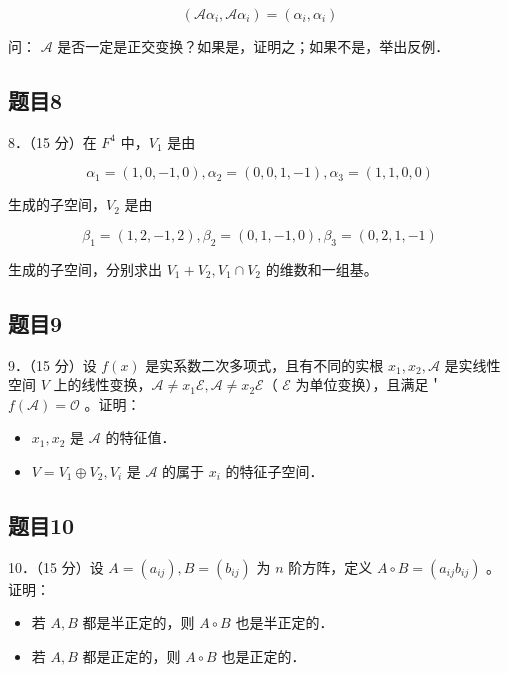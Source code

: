 \documentclass{article}
\begin{document}
\[
\left(\mathcal{A} \alpha_{i}, \mathcal{A} \alpha_{i}\right)=\left(\alpha_{i}, \alpha_{i}\right)
\]

问： \(\mathcal{A}\) 是否一定是正交变换？如果是，证明之；如果不是，举出反例．

\subsection{题目8}
8．（15 分）在 \(F^{4}\) 中，\(V_{1}\) 是由

\[
\alpha_{1}=(1,0,-1,0), \alpha_{2}=(0,0,1,-1), \alpha_{3}=(1,1,0,0)
\]

生成的子空间，\(V_{2}\) 是由

\[
\beta_{1}=(1,2,-1,2), \beta_{2}=(0,1,-1,0), \beta_{3}=(0,2,1,-1)
\]

生成的子空间，分别求出 \(V_{1}+V_{2}, V_{1} \cap V_{2}\) 的维数和一组基。

\subsection{题目9}
9．（15 分）设 \(f(x)\) 是实系数二次多项式，且有不同的实根 \(x_{1}, x_{2}, \mathcal{A}\) 是实线性空间 \(V\) 上的线性变换，\(\mathcal{A} \neq x_{1} \mathcal{E}, \mathcal{A} \neq x_{2} \mathcal{E}\)（ \(\mathcal{E}\) 为单位变换），且满足＇\(f(\mathcal{A})=\mathcal{O}\) 。证明：

\begin{itemize}
  \item[（1）] \(x_{1}, x_{2}\) 是 \(\mathcal{A}\) 的特征值．
  \item[（2）] \(V=V_{1} \oplus V_{2}, V_{i}\) 是 \(\mathcal{A}\) 的属于 \(x_{i}\) 的特征子空间．
\end{itemize}

\subsection{题目10}
10．（15 分）设 \(A=\left(a_{i j}\right), B=\left(b_{i j}\right)\) 为 \(n\) 阶方阵，定义 \(A \circ B=\left(a_{i j} b_{i j}\right)\) 。证明：

\begin{itemize}
  \item[（1）] 若 \(A, B\) 都是半正定的，则 \(A \circ B\) 也是半正定的．
  \item[（2）] 若 \(A, B\) 都是正定的，则 \(A \circ B\) 也是正定的．
\end{itemize}
\end{document}
